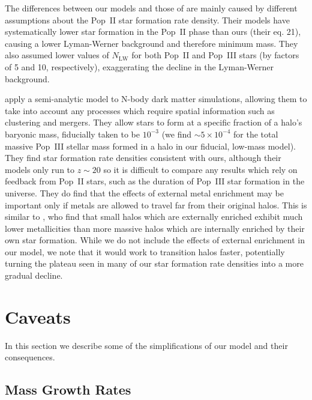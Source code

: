 \documentclass[a4paper,fleqn,usenatbib]{mnras}
\begin{document}
The differences between our models and those of \citet{jaacks_2017} are mainly caused by different assumptions about the Pop~II star formation rate density. Their models have systematically lower star formation in the Pop~II phase than ours (their eq. 21), causing a lower Lyman-Werner background and therefore minimum mass. They also assumed lower values of $N_\text{LW}$ for both Pop~II and Pop~III stars (by factors of 5 and 10, respectively), exaggerating the decline in the Lyman-Werner background.

\citet{visbal_2017} apply a semi-analytic model to N-body dark matter simulations, allowing them to take into account any processes which require spatial information such as clustering and mergers. They allow stars to form at a specific fraction of a halo's baryonic mass, fiducially taken to be $10^{-3}$ (we find $\sim 5 \times 10^{-4}$ for the total massive Pop~III stellar mass formed in a halo in our fiducial, low-mass model). 
They find star formation rate densities consistent with ours, although their models only run to $z \sim 20$ so it is difficult to compare any results which rely on feedback from Pop~II stars, such as the duration of Pop~III star formation in the universe. They do find that the effects of external metal enrichment may be important only if metals are allowed to travel far from their original halos. This is similar to \citet{jaacks_2017}, who find that small halos which are externally enriched exhibit much lower metallicities than more massive halos which are internally enriched by their own star formation. While we do not include the effects of external enrichment in our model, we note that it would work to transition halos faster, potentially turning the plateau seen in many of our star formation rate densities into a more gradual decline.

\section{Caveats}
\label{sec:caveats}

In this section we describe some of the simplifications of our model and their consequences.

\subsection{Mass Growth Rates}
\label{sec:trac_caveat}
\end{document}
